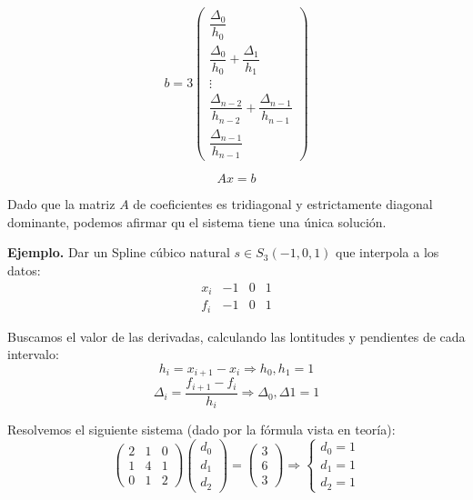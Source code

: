 $$b=3\left( \begin{array}{c}
            \dfrac{\Delta_0}{h_0}                                         \\
            \dfrac{\Delta_0}{h_0} + \dfrac{\Delta_1}{h_1}                 \\
            \vdots                                                        \\
            \dfrac{\Delta_{n-2}}{h_{n-2}} + \dfrac{\Delta_{n-1}}{h_{n-1}} \\
            \dfrac{\Delta_{n-1}}{h_{n-1}}
        \end{array} \right)$$

$$Ax=b$$

\noindent
Dado que la matriz $A$ de coeficientes es tridiagonal y estrictamente diagonal dominante, podemos
afirmar qu el sistema tiene una única solución.

\bigskip
\noindent
\textbf{Ejemplo.}
Dar un Spline cúbico natural $s \in S_3(-1, 0, 1)$ que interpola a los datos:
$$\begin{array}{c|ccc}
        x_i & -1 & 0 & 1 \\
        \hline
        f_i & -1 & 0 & 1
    \end{array}$$

\bigskip
\noindent
Buscamos el valor de las derivadas, calculando las lontitudes y pendientes de cada intervalo:
$$h_i = x_{i+1}-x_i \Rightarrow h_0,h_1=1$$
$$\Delta_i = \dfrac{f_{i+1}-f_i}{h_i} \Rightarrow \Delta_0,\Delta1 = 1$$

\noindent
Resolvemos el siguiente sistema (dado por la fórmula vista en teoría):
$$\left( \begin{array}{ccc}
            2 & 1 & 0 \\
            1 & 4 & 1 \\
            0 & 1 & 2
        \end{array} \right) \left( \begin{array}{c}
            d_0 \\
            d_1 \\
            d_2
        \end{array} \right) = \left( \begin{array}{c}
            3 \\
            6 \\
            3
        \end{array} \right) \Rightarrow \left\{ \begin{array}{c}
        d_0 = 1 \\
        d_1 = 1 \\
        d_2 = 1
    \end{array} \right.$$

